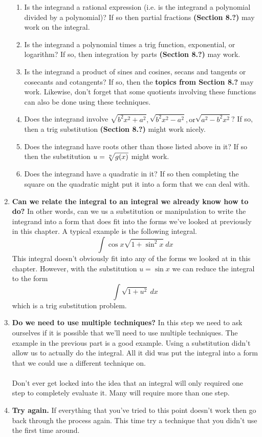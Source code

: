 \documentclass[11pt]{report}
\begin{document}
\begin{enumerate}
\begin{enumerate}[label= \alph*.]
\item Is the integrand a rational expression (i.e. is the integrand a polynomial divided by a polynomial)? If so then partial fractions \textbf{(Section 8.?)} may work on the integral.

\item Is the integrand a polynomial times a trig function, exponential, or logarithm? If so, then integration by parts \textbf{(Section 8.?)} may work.

\item Is the integrand a product of sines and cosines, secans and tangents or cosecants and cotangents? If so, then the \textbf{topics from Section 8.?} may work. Likewise, don't forget that some quotients involving these functions can also be done using these techniques.

\item Does the integrand involve $\sqrt {b^2x^2 + a^2}, \sqrt {b^2x^2 - a^2}, \text{or} \sqrt { a^2-b^2x^2}$? If so, then a trig substitution \textbf{(Section 8.?)} might work nicely.

\item Does the integrand have roots other than those listed above in it? If so then the substitution $u = \root n \of {g(x)}$ might work.

\item Does the integrand have a quadratic in it? If so then completing the square on the quadratic might put it into a form that we can deal with. 
\end{enumerate}

\item \textbf{Can we relate the integral to an integral we already know how to do?} In other words, can we us a substitution or manipulation to write the integrand into a  form that does fit into the forms we've looked at previously in this chapter. A typical example is the following integral.$$\int \cos x\sqrt{1 + \sin^2 x}~dx$$
This integral doesn't obviously fit into any of the forms we looked at in this chapter. However, with the substitution $u = \sin x$ we can reduce the integral to the form $$\int \sqrt{1+u^2}~dx$$ which is a trig substitution problem.

\item \textbf{Do we need to use multiple techniques?} In this step we need to ask ourselves if it is possible that we'll need to use multiple techniques. The example in the previous part is a good example. Using a substitution didn't allow us to actually do the integral. All it did was put the integral into a form that we could use a different technique on.\\ \\
Don't ever get locked into the idea that an integral will only required one step to completely evaluate it. Many will require more than one step.

\item \textbf{Try again.} If everything that you've tried to this point doesn't work then go back through the process again. This time try a technique that you didn't use the first time around.
\end{enumerate}
\end{document}
